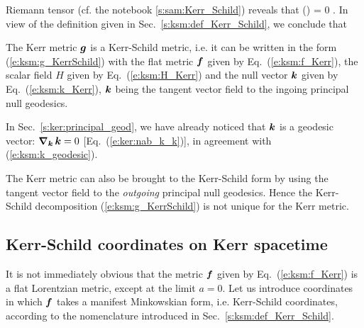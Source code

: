 Riemann tensor (cf. the notebook \ref{s:sam:Kerr_Schild}) reveals that
\be
    () = 0 .
\ee
In view of the definition given in Sec.~\ref{s:ksm:def_Kerr_Schild},
we conclude that
\begin{greybox}
The Kerr metric $\bm{g}$ is a Kerr-Schild metric, i.e. it can be written in
the form (\ref{e:ksm:g_KerrSchild}) with the flat metric
$\bm{f}$ given by Eq.~(\ref{e:ksm:f_Kerr}), the scalar field $H$ given
by Eq.~(\ref{e:ksm:H_Kerr}) and the null vector $\bm{k}$ given by
Eq.~(\ref{e:ksm:k_Kerr}), $\bm{k}$ being the tangent vector field to
the ingoing principal null geodesics.
\end{greybox}
In Sec.~\ref{s:ker:principal_geod},
we have already noticed that $\bm{k}$ is a geodesic vector:
$\bm{\nabla}_{\bm{k}}\, \bm{k} = 0$ [Eq.~(\ref{e:ker:nab_k_k})], in agreement with
(\ref{e:ksm:k_geodesic}).

\begin{remark}
The Kerr metric can also be brought to the Kerr-Schild form by using the
tangent vector field to the  \emph{outgoing} principal null geodesics. Hence
the Kerr-Schild decomposition (\ref{e:ksm:g_KerrSchild}) is not unique for
the Kerr metric.
\end{remark}

\subsection{Kerr-Schild coordinates on Kerr spacetime}

It is not immediately obvious that the metric $\bm{f}$ given by
Eq.~(\ref{e:ksm:f_Kerr}) is a flat Lorentzian metric, except at the limit $a=0$.
Let us introduce coordinates in which $\bm{f}$ takes a manifest Minkowskian
form, i.e. Kerr-Schild coordinates, according to the nomenclature introduced
in Sec.~\ref{s:ksm:def_Kerr_Schild}.

